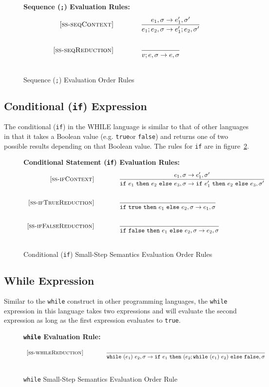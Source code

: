 \documentclass{article}
\newcommand{\ife}[3]{\mbox{\tt if}~{#1}~\mbox{\tt then}~{#2}~\mbox{\tt else}~{#3}}
\newcommand{\whilee}[2]{\mbox{\tt while}~(#1)~#2}
\newcommand{\true}{\mbox{\tt true}}
\newcommand{\false}{\mbox{\tt false}}
\begin{document}
\begin{figure}[H]
\caption{Sequence ({\tt ;}) Evaluation Order Rules}
\label{fig:seqRules}
{\bf Sequence ({\tt ;}) Evaluation Rules:}
\[
\\
\begin{array}{r@{\qquad\qquad}l}
\ssrule{ss-seqContext}{
  \sstep{e_1}{\sigma}{e_1'}{\sigma'}
}{
  \sstep{e_1 ; e_2}{\sigma}{e_1' ; e_2}{\sigma'}
}
\ssrule{ss-seqReduction}{
}{
  \sstep{v ; e}{\sigma}{e}{\sigma}
}
\end{array}
\]
\end{figure}

\subsection{Conditional ({\tt if}) Expression}

The conditional ({\tt if}) in the WHILE language is similar to that of other languages in that it takes a Boolean value (e.g. \true or \false) and returns one of two possible results depending on that Boolean value.  The rules for {\tt if} are in figure~\ref{fig:condRules}.

\begin{figure}[H]
\caption{Conditional ({\tt if}) Small-Step Semantics Evaluation Order Rules}
\label{fig:condRules}
{\bf Conditional Statement ({\tt if}) Evaluation Rules:}
\[
\\
\begin{array}{r@{\qquad\qquad}l}
\ssrule{ss-ifContext}{
  \sstep{e_1}{\sigma}{e_1'}{\sigma'}
}{
  \sstep{\ife{e_1}{e_2}{e_3}}{\sigma}{\ife{e_1'}{e_2}{e_3}}{\sigma'}
}
\ssrule{ss-ifTrueReduction}{
}{
  \sstep{\ife{\true}{e_1}{e_2}}{\sigma}{e_1}{\sigma}
}
\ssrule{ss-ifFalseReduction}{
}{
  \sstep{\ife{\false}{e_1}{e_2}}{\sigma}{e_2}{\sigma}
}
\end{array}
\]
\end{figure}

\subsection{While Expression}

Similar to the {\tt while} construct in other programming languages, the {\tt while} expression in this language takes two expressions and will evaluate the second expression as long as the first expression evaluates to \true.

\begin{figure}[H]
\caption{{\tt while} Small-Step Semantics Evaluation Order Rule}
\label{fig:whileRules}
{\bf {\tt while} Evaluation Rule:} 
\[
\\
\begin{array}{r@{\qquad\qquad}l}
\ssrule{ss-whileReduction}{
}{
  \sstep{\whilee{e_1}{e_2}}{\sigma}{\ife{e_1}{(e_2;\whilee{e_1}{e_2})}{\false}}{\sigma}
}
\end{array}
\]
\end{figure}
\end{document}
